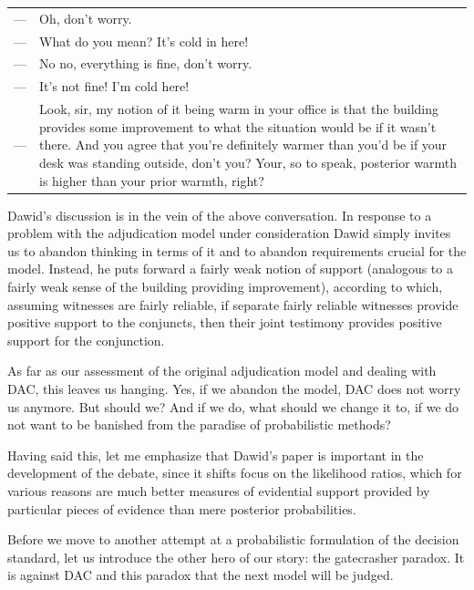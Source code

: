 \documentclass[10pt,dvipsnames,enabledeprecatedfontcommands]{scrartcl}
\begin{document}
\vspace{1mm}

\begin{tabular}{lp{10cm}}
 --- & Oh, don't worry. \\
 --- & What do you mean? It's cold in here! \\
 --- & No no, everything is fine, don't worry.\\
 --- & It's not fine! I'm cold here! \\
 --- & Look, sir, my notion of it being warm in your office is that the building provides some improvement to what the situation would be if it wasn't there. And you agree that you're definitely warmer than you'd be if your desk was standing outside, don't you? Your, so to speak, posterior warmth is higher than your prior warmth, right? 
 \end{tabular}

\vspace{1mm}

Dawid's discussion is in the vein of the above conversation. In response
to a problem with the adjudication model under consideration Dawid
simply invites us to abandon thinking in terms of it and to abandon
requirements crucial for the model. Instead, he puts forward a fairly
weak notion of support (analogous to a fairly weak sense of the building
providing improvement), according to which, assuming witnesses are
fairly reliable, if separate fairly reliable witnesses provide positive
support to the conjuncts, then their joint testimony provides positive
support for the conjunction.

As far as our assessment of the original adjudication model and dealing
with DAC, this leaves us hanging. Yes, if we abandon the model, DAC does
not worry us anymore. But should we? And if we do, what should we change
it to, if we do not want to be banished from the paradise of
probabilistic methods?

Having said this, let me emphasize that Dawid's paper is important in
the development of the debate, since it shifts focus on the likelihood
ratios, which for various reasons are much better measures of evidential
support provided by particular pieces of evidence than mere posterior
probabilities.

Before we move to another attempt at a probabilistic formulation of the
decision standard, let us introduce the other hero of our story: the
gatecrasher paradox. It is against DAC and this paradox that the next
model will be judged.
\end{document}
